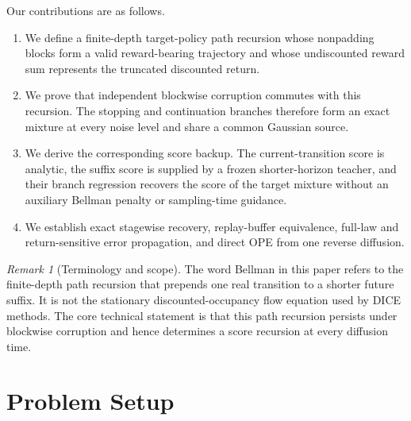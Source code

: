 \documentclass[11pt]{article}
\theoremstyle{definition}
\theoremstyle{remark}
\newtheorem{remark}[theorem]{Remark}
\begin{document}
Our contributions are as follows.
\begin{enumerate}
    \item We define a finite-depth target-policy path recursion whose
    nonpadding blocks form a valid reward-bearing trajectory and whose
    undiscounted reward sum represents the truncated discounted return.
    \item We prove that independent blockwise corruption commutes with this
    recursion. The stopping and continuation branches therefore form an exact
    mixture at every noise level and share a common Gaussian source.
    \item We derive the corresponding score backup. The current-transition
    score is analytic, the suffix score is supplied by a frozen shorter-horizon
    teacher, and their branch regression recovers the score of the target
    mixture without an auxiliary Bellman penalty or sampling-time guidance.
    \item We establish exact stagewise recovery, replay-buffer equivalence,
    full-law and return-sensitive error propagation, and direct OPE from one
    reverse diffusion.
\end{enumerate}

\begin{remark}[Terminology and scope]
\label{rem:terminology}
The word Bellman in this paper refers to the finite-depth path recursion that
prepends one real transition to a shorter future suffix. It is not the
stationary discounted-occupancy flow equation used by DICE methods. The core
technical statement is that this path recursion persists under blockwise
corruption and hence determines a score recursion at every diffusion time.
\end{remark}

\section{Problem Setup}
\label{sec:setup}
\end{document}
